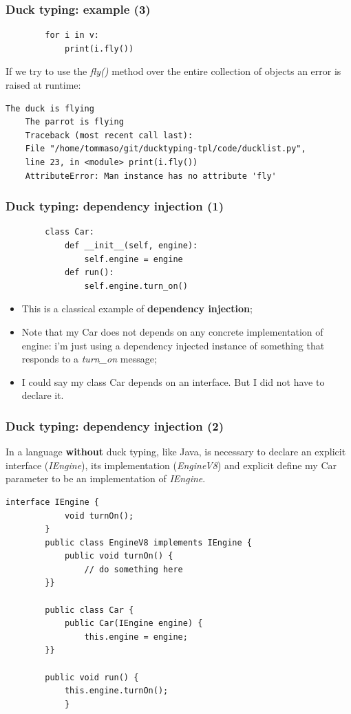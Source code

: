 \documentclass[xcolor ={table,usenames,dvipsnames}]{beamer}
\theoremstyle{definition}
\begin{document}
	\begin{frame}[fragile]
		\frametitle{Duck typing: example (3)}
		\begin{lstlisting}	
		for i in v:
			print(i.fly())
		\end{lstlisting}
		If we try to use the \textit{fly()} method  over the entire collection of objects an error is raised at runtime:
			\begin{lstlisting}[keywordstyle=\color{black},
		commentstyle=\color{black},
	stringstyle=\color{black}.]	
	The duck is flying
	The parrot is flying
	Traceback (most recent call last):
	File "/home/tommaso/git/ducktyping-tpl/code/ducklist.py", 
	line 23, in <module> print(i.fly())
	AttributeError: Man instance has no attribute 'fly'
		\end{lstlisting}
	\end{frame}

	\begin{frame}[fragile]
		\frametitle{Duck typing: dependency injection (1)}
		\begin{lstlisting}
		class Car:
			def __init__(self, engine):
				self.engine = engine
			def run():
				self.engine.turn_on()			
		\end{lstlisting}
		
		\begin{itemize}
			\item This is a classical example of \textbf{dependency injection};
			\item Note that my Car does not depends on any concrete implementation of engine: i'm just using a dependency injected instance of something that responds to a \textit{turn\_on} message;
			\item I could say my class Car depends on an interface. But I did not have to declare it. %
		\end{itemize}	
	\end{frame}

	\begin{frame}[fragile]
		\frametitle{Duck typing: dependency injection (2)}
		In a language \textbf{without} duck typing, like Java, is necessary to declare an explicit interface (\textit{IEngine}), its implementation (\textit{EngineV8}) and explicit define my Car parameter to be an implementation of \textit{IEngine}.	
		
		\begin{lstlisting}[basicstyle=\fontsize{2}{4}\selectfont\ttfamily\tiny]
		interface IEngine {
			void turnOn();
		}
		public class EngineV8 implements IEngine {
			public void turnOn() {
				// do something here
		}}
		
		public class Car {
			public Car(IEngine engine) {
				this.engine = engine;
		}}
		
		public void run() {
			this.engine.turnOn();
			}
		\end{lstlisting}
	\end{frame}
\end{document}
